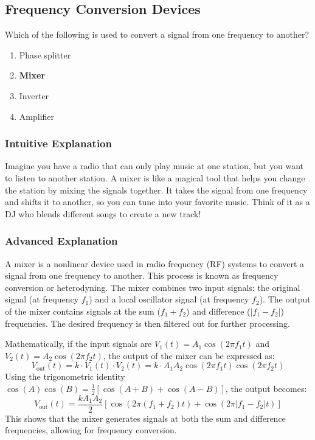 \subsection{Frequency Conversion Devices}
\label{T7A03}

\begin{tcolorbox}[colback=gray!10!white,colframe=black!75!black,title=T7A03]
Which of the following is used to convert a signal from one frequency to another?
\begin{enumerate}[label=\Alph*)]
    \item Phase splitter
    \item \textbf{Mixer}
    \item Inverter
    \item Amplifier
\end{enumerate}
\end{tcolorbox}

\subsubsection{Intuitive Explanation}
Imagine you have a radio that can only play music at one station, but you want to listen to another station. A mixer is like a magical tool that helps you change the station by mixing the signals together. It takes the signal from one frequency and shifts it to another, so you can tune into your favorite music. Think of it as a DJ who blends different songs to create a new track!

\subsubsection{Advanced Explanation}
A mixer is a nonlinear device used in radio frequency (RF) systems to convert a signal from one frequency to another. This process is known as frequency conversion or heterodyning. The mixer combines two input signals: the original signal (at frequency \( f_1 \)) and a local oscillator signal (at frequency \( f_2 \)). The output of the mixer contains signals at the sum (\( f_1 + f_2 \)) and difference (\( |f_1 - f_2| \)) frequencies. The desired frequency is then filtered out for further processing.

Mathematically, if the input signals are \( V_1(t) = A_1 \cos(2\pi f_1 t) \) and \( V_2(t) = A_2 \cos(2\pi f_2 t) \), the output of the mixer can be expressed as:
\[
V_{\text{out}}(t) = k \cdot V_1(t) \cdot V_2(t) = k \cdot A_1 A_2 \cos(2\pi f_1 t) \cos(2\pi f_2 t)
\]
Using the trigonometric identity \( \cos(A)\cos(B) = \frac{1}{2}[\cos(A+B) + \cos(A-B)] \), the output becomes:
\[
V_{\text{out}}(t) = \frac{k A_1 A_2}{2} [\cos(2\pi (f_1 + f_2) t) + \cos(2\pi |f_1 - f_2| t)]
\]
This shows that the mixer generates signals at both the sum and difference frequencies, allowing for frequency conversion.

